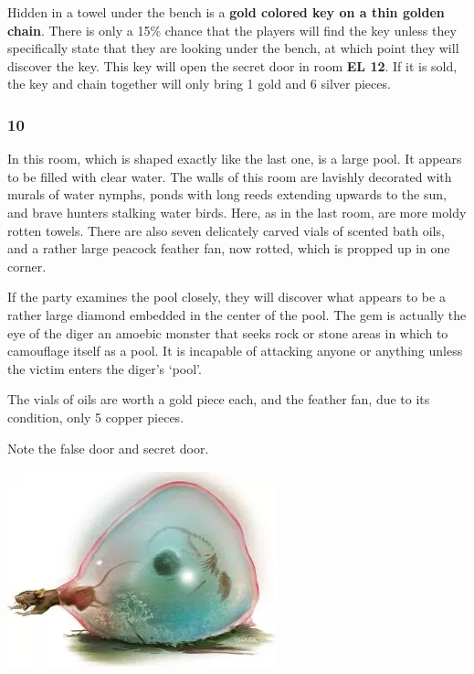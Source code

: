 \documentclass[palace_of_the_silver_princess]{subfiles}
\begin{document}
Hidden in a towel under the bench is a \textbf{gold colored key on a
thin golden chain}. There is only a 15\% chance that the players will
find the key unless they specifically state that they are looking under
the bench, at which point they will discover the key. This key will open
the secret door in room \textbf{EL 12}. If it is sold, the key and chain
together will only bring 1 gold and 6 silver pieces.

\subsubsection{10}
\begin{quotebox}
    In this room, which is shaped exactly like the last one, is a large
    pool. It appears to be filled with clear water. The walls of this
    room are lavishly decorated with murals of water nymphs, ponds with
    long reeds extending upwards to the sun, and brave hunters stalking
    water birds. Here, as in the last room, are more moldy rotten
    towels. There are also seven delicately carved vials of scented bath
    oils, and a rather large peacock feather fan, now rotted, which is
    propped up in one corner.
\end{quotebox}

If the party examines the pool closely, they will discover what appears
to be a rather large diamond embedded in the center of the pool. The gem
is actually the eye of the diger an amoebic monster that seeks rock or
stone areas in which to camouflage itself as a pool. It is incapable
of attacking anyone or anything unless the victim enters the diger’s
‘pool’.

The vials of oils are worth a gold piece each, and the feather fan, due
to its condition, only 5 copper pieces.

Note the false door and secret door.

\includegraphics[width=\columnwidth]{img/diger.png}
\end{document}
